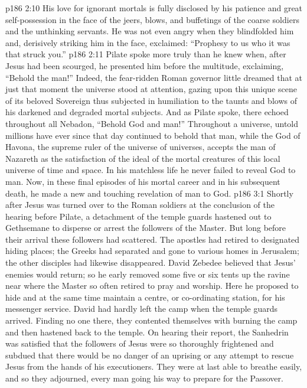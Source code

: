 \vs p186 2:10 His love for ignorant mortals is fully disclosed by his patience and great self\hyp{}possession in the face of the jeers, blows, and buffetings of the coarse soldiers and the unthinking servants. He was not even angry when they blindfolded him and, derisively striking him in the face, exclaimed: “Prophesy to us who it was that struck you.”
\vs p186 2:11 Pilate spoke more truly than he knew when, after Jesus had been scourged, he presented him before the multitude, exclaiming, “Behold the man!” Indeed, the fear\hyp{}ridden Roman governor little dreamed that at just that moment the universe stood at attention, gazing upon this unique scene of its beloved Sovereign thus subjected in humiliation to the taunts and blows of his darkened and degraded mortal subjects. And as Pilate spoke, there echoed throughout all Nebadon, “Behold God and man!” Throughout a universe, untold millions have ever since that day continued to behold that man, while the God of Havona, the supreme ruler of the universe of universes, accepts the man of Nazareth as the satisfaction of the ideal of the mortal creatures of this local universe of time and space. In his matchless life he never failed to reveal God to man. Now, in these final episodes of his mortal career and in his subsequent death, he made a new and touching revelation of man to God.
\vs p186 3:1 Shortly after Jesus was turned over to the Roman soldiers at the conclusion of the hearing before Pilate, a detachment of the temple guards hastened out to Gethsemane to disperse or arrest the followers of the Master. But long before their arrival these followers had scattered. The apostles had retired to designated hiding places; the Greeks had separated and gone to various homes in Jerusalem; the other disciples had likewise disappeared. David Zebedee believed that Jesus’ enemies would return; so he early removed some five or six tents up the ravine near where the Master so often retired to pray and worship. Here he proposed to hide and at the same time maintain a centre, or co\hyp{}ordinating station, for his messenger service. David had hardly left the camp when the temple guards arrived. Finding no one there, they contented themselves with burning the camp and then hastened back to the temple. On hearing their report, the Sanhedrin was satisfied that the followers of Jesus were so thoroughly frightened and subdued that there would be no danger of an uprising or any attempt to rescue Jesus from the hands of his executioners. They were at last able to breathe easily, and so they adjourned, every man going his way to prepare for the Passover.
